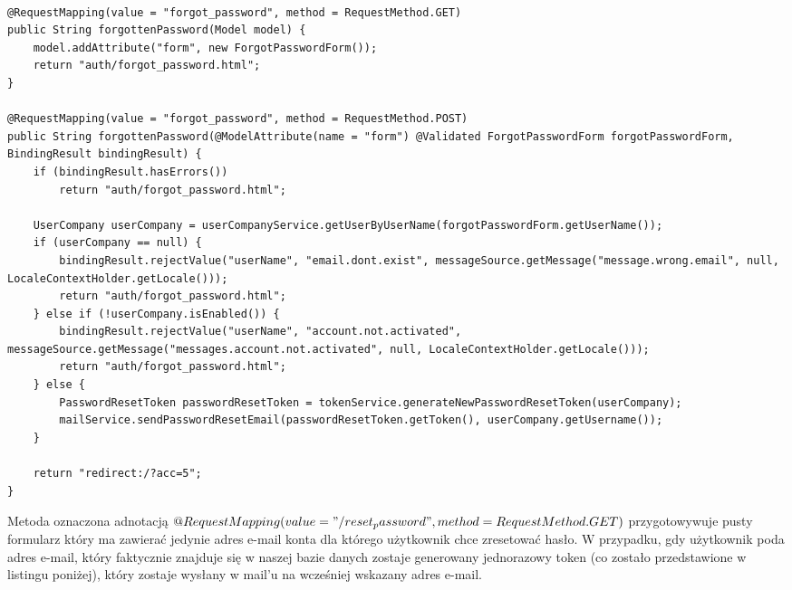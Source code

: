 \paragraph{}
\begin{center}
\begin{lstlisting}[caption={Listing kodu obsługującego odzyskiwanie hasła.},captionpos=b]
@RequestMapping(value = "forgot_password", method = RequestMethod.GET)
public String forgottenPassword(Model model) {
	model.addAttribute("form", new ForgotPasswordForm());
	return "auth/forgot_password.html";
}

@RequestMapping(value = "forgot_password", method = RequestMethod.POST)
public String forgottenPassword(@ModelAttribute(name = "form") @Validated ForgotPasswordForm forgotPasswordForm, BindingResult bindingResult) {
	if (bindingResult.hasErrors())
		return "auth/forgot_password.html";

	UserCompany userCompany = userCompanyService.getUserByUserName(forgotPasswordForm.getUserName());
	if (userCompany == null) {
		bindingResult.rejectValue("userName", "email.dont.exist", messageSource.getMessage("message.wrong.email", null, LocaleContextHolder.getLocale()));
		return "auth/forgot_password.html";
	} else if (!userCompany.isEnabled()) {
		bindingResult.rejectValue("userName", "account.not.activated", messageSource.getMessage("messages.account.not.activated", null, LocaleContextHolder.getLocale()));
		return "auth/forgot_password.html";
	} else {
		PasswordResetToken passwordResetToken = tokenService.generateNewPasswordResetToken(userCompany);
		mailService.sendPasswordResetEmail(passwordResetToken.getToken(), userCompany.getUsername());
	}

	return "redirect:/?acc=5";
}
\end{lstlisting}
\end{center}
Metoda oznaczona adnotacją $@RequestMapping(value = "/reset_password", method = RequestMethod.GET)$ przygotowywuje pusty formularz który ma zawierać jedynie adres e-mail konta dla którego użytkownik chce zresetować hasło. W przypadku, gdy użytkownik poda adres e-mail, który faktycznie znajduje się w naszej bazie danych zostaje generowany jednorazowy token (co zostało przedstawione w listingu poniżej), który zostaje wysłany w mail'u na wcześniej wskazany adres e-mail.

